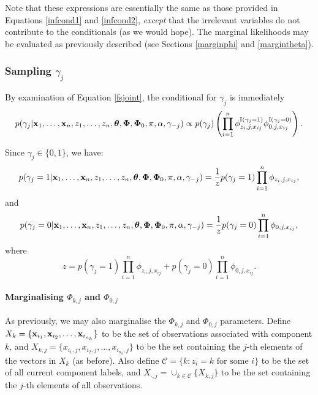 \documentclass[12pt]{article}
\begin{document}
Note that these expressions are essentially the same as those provided in Equations \eqref{infcond1} and \eqref{infcond2}, {\em except} that the irrelevant variables do not contribute to the conditionals (as we would hope).  The marginal likelihoods may be evaluated as previously described (see Sections \ref{marginphi} and \ref{margintheta}). 

\subsubsection{Sampling $\gamma_j$}
By examination of Equation \eqref{fsjoint}, the conditional for $\gamma_j$ is immediately
\begin{equation}
p(\gamma_j|{\bf x}_1,\ldots, {\bf x}_n,z_1, \ldots, z_n, \boldsymbol{\theta}, \boldsymbol{\Phi}, \boldsymbol{\Phi}_0, \pi, \alpha, \gamma_{-j}) \propto p(\gamma_j)\left(\prod_{i=1}^n   \phi_{z_i,j,x_{ij}}^{\mathbb{I}(\gamma_j=1)}\phi_{0,j,x_{ij}}^{\mathbb{I}(\gamma_j=0)}\right).\label{gammacond1}
\end{equation}

Since $\gamma_j \in \{0,1\}$, we have:
\begin{equation}
p(\gamma_j = 1|{\bf x}_1,\ldots, {\bf x}_n,z_1, \ldots, z_n, \boldsymbol{\theta}, \boldsymbol{\Phi}, \boldsymbol{\Phi}_0, \pi, \alpha, \gamma_{-j}) = \frac{1}{z} p(\gamma_j = 1)\prod_{i=1}^n   \phi_{z_i,j,x_{ij}},\label{gammacond2a}
\end{equation}
and
\begin{equation}
p(\gamma_j = 0|{\bf x}_1,\ldots, {\bf x}_n,z_1, \ldots, z_n, \boldsymbol{\theta}, \boldsymbol{\Phi}, \boldsymbol{\Phi}_0, \pi, \alpha, \gamma_{-j}) = \frac{1}{z}p(\gamma_j = 0)\prod_{i=1}^n   \phi_{0,j,x_{ij}},\label{gammacond2b}
\end{equation}
where $$z = p(\gamma_j = 1)\prod_{i=1}^n   \phi_{z_i,j,x_{ij}} + p(\gamma_j = 0)\prod_{i=1}^n   \phi_{0,j,x_{ij}}.$$
\paragraph{Marginalising $\Phi_{k,j}$ and $\Phi_{0,j}$}
As previously, we may also marginalise the $\Phi_{k,j}$ and $\Phi_{0,j}$ parameters.  Define $X_{k} = \{ {\bf x}_{i_1}, {\bf x}_{i_2}, \ldots, {\bf x}_{i_{n_k}} \}$ to be the set of observations associated with component $k$, and $X_{k, j} = \{ { x}_{i_1,j}, { x}_{i_2,j}, \ldots, { x}_{i_{n_k},j} \}$ to be the set containing the $j$-th elements of the vectors in $X_{k}$ (as before).  Also define $\mathcal{C} = \{k:  z_i = k \mbox{ for some } i \}$ to be the set of all current component labels, and $X_{\cdot, j} = \cup_{k \in \mathcal{C}} \{ X_{k, j}  \}$ to be the set containing the $j$-th elements of all observations.   
\end{document}
